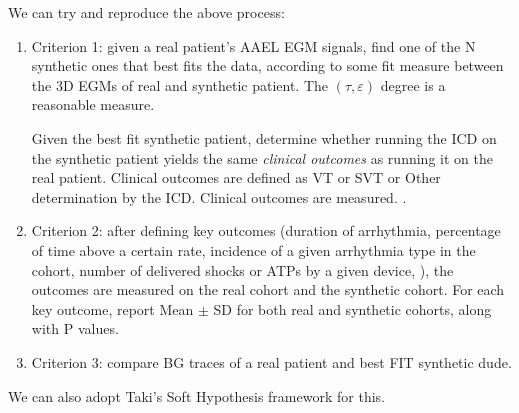 We can try and reproduce the above process:
\begin{enumerate}
	\item Criterion 1: given a real patient's AAEL EGM signals, find one of the N synthetic ones that best fits the data, according to some fit measure between the 3D EGMs of real and synthetic patient.
	The $(\tau,\varepsilon)$ degree is a reasonable measure.
	
	Given the best fit synthetic patient, determine whether running the ICD on the synthetic patient yields the same \emph{clinical outcomes} as running it on the real patient. 
	Clinical outcomes are defined as VT or SVT or Other determination by the ICD.
	Clinical outcomes are measured. .
	
	\item Criterion 2: after defining key outcomes (duration of arrhythmia, percentage of time above a certain rate, incidence of a given arrhythmia type in the cohort, number of delivered shocks or ATPs by a given device, ), the outcomes are measured on the real cohort and the synthetic cohort.
	For each key outcome, report Mean $\pm$ SD for both real and synthetic cohorts, along with P values.
	
	\item Criterion 3: compare BG traces of a real patient and best FIT synthetic dude.
\end{enumerate}

We can also adopt Taki's Soft Hypothesis framework for this.